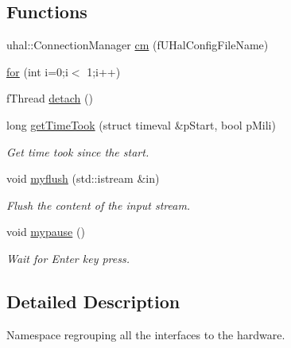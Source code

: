 \subsection*{Functions}
\begin{DoxyCompactItemize}
\item 
uhal\-::\-Connection\-Manager \hyperlink{namespace_ph2___hw_interface_aeee4c168d3cfbc0f58774cfea91e0363}{cm} (f\-U\-Hal\-Config\-File\-Name)
\item 
\hyperlink{namespace_ph2___hw_interface_a913071592e2cafb4f781028cebbfff8b}{for} (int i=0;i$<$ 1;i++)
\item 
f\-Thread \hyperlink{namespace_ph2___hw_interface_a4a4be1daf233dc838bd9618cf48dd5a8}{detach} ()
\item 
long \hyperlink{namespace_ph2___hw_interface_a033a07cbe28368de19d534ef7cd3325d}{get\-Time\-Took} (struct timeval \&p\-Start, bool p\-Mili)
\begin{DoxyCompactList}\small\item\em Get time took since the start. \end{DoxyCompactList}\item 
void \hyperlink{namespace_ph2___hw_interface_a2fe2ee1ddb69c79c23bf9b0b2fa58f67}{myflush} (std\-::istream \&in)
\begin{DoxyCompactList}\small\item\em Flush the content of the input stream. \end{DoxyCompactList}\item 
void \hyperlink{namespace_ph2___hw_interface_a20399ed909de2641f1e7e086a4ec3667}{mypause} ()
\begin{DoxyCompactList}\small\item\em Wait for Enter key press. \end{DoxyCompactList}\end{DoxyCompactItemize}


\subsection{Detailed Description}
Namespace regrouping all the interfaces to the hardware. 

